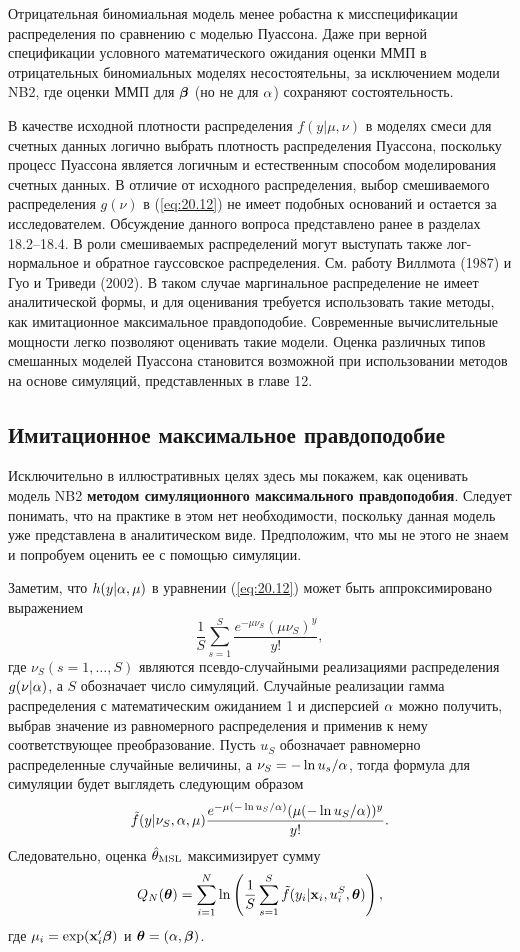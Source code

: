 Отрицательная биномиальная модель менее робастна к мисспецификации распределения по сравнению с моделью Пуассона. Даже при верной спецификации условного математического ожидания оценки ММП в отрицательных биномиальных моделях несостоятельны, за исключением модели NB2, где оценки ММП для $\bm{\beta}$ (но не для $\alpha$) сохраняют состоятельность.

В качестве исходной плотности распределения $f(y|\mu, \nu)$ в моделях смеси для счетных данных логично выбрать плотность распределения Пуассона, поскольку процесс Пуассона является логичным и естественным способом моделирования счетных данных. В отличие от исходного распределения, выбор смешиваемого распределения $g(\nu)$ в (\ref{eq:20.12}) не имеет подобных оснований и остается за исследователем. Обсуждение данного вопроса представлено ранее в разделах 18.2--18.4. В роли смешиваемых распределений могут выступать также лог-нормальное и обратное гауссовское распределения. См. работу Виллмота (1987) и Гуо и Триведи (2002). В таком случае маргинальное распределение не имеет аналитической формы, и для оценивания требуется использовать такие методы, как имитационное максимальное правдоподобие. Современные вычислительные мощности легко позволяют оценивать такие модели. Оценка различных типов смешанных моделей Пуассона становится возможной при использовании методов на основе симуляций, представленных в главе 12.


\subsection{Имитационное максимальное правдоподобие}\label{sec:20.4.2}

\noindent
Исключительно в иллюстративных целях здесь мы покажем, как оценивать модель NB2 \textbf{методом симуляционного максимального правдоподобия}. Следует понимать, что на практике в этом нет необходимости, поскольку данная модель уже представлена в аналитическом виде. Предположим, что мы не этого не знаем и попробуем оценить ее с помощью симуляции.

Заметим, что $h(y|\alpha, \mu)$ в уравнении (\ref{eq:20.12}) может быть аппроксимировано выражением
    $$\frac{1}{S}\sum^{S}_{s = 1} \frac{e^{-\mu\nu_S}(\mu\nu_S)^y}{y!},$$
где $\nu_S(s = 1, \ldots , S)$ являются псевдо-случайными реализациями распределения $g(\nu|\alpha)$, а $S$ обозначает число симуляций. Случайные реализации гамма распределения с математическим ожиданием 1 и дисперсией $\alpha$ можно получить, выбрав значение из равномерного распределения и применив к нему соответствующее преобразование. Пусть $u_S$ обозначает равномерно распределенные случайные величины, а $\nu_S = -\ln u_s/\alpha$, тогда формула для симуляции будет выглядеть следующим образом
    $$\tilde{f}(y|\nu_S, \alpha, \mu)\frac{e^{-\mu(-\ln u_S / \alpha)}(\mu(-\ln u_S/\alpha))^y}{y!}.$$
Следовательно, оценка $\hat{\theta}_{\mathrm{MSL}}$ максимизирует сумму
    \begin{align}\label{eq:20.14}
    Q_N(\bm{\theta}) = \sum^{N}_{i = 1}\ln \left( \frac{1}{S}\sum^{S}_{s = 1}\tilde{f}(y_i|\mathbf{x}_i, u^S_i, \bm{\theta})\right),
    \end{align}
где $\mu_i = \exp(\mathbf{x}_i'\bm{\beta})$ и $\bm{\theta} = (\alpha, \bm{\beta})$.

